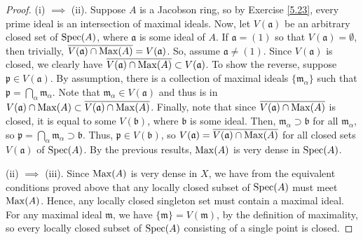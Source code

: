 \begin{proof}
(i) $\implies$ (ii). Suppose $A$ is a Jacobson ring, so by Exercise \ref{5.23}, every prime ideal is an intersection of maximal ideals. Now, let $V(\mathfrak{a})$
be an arbitrary closed set of $\operatorname{Spec}(A)$, where $\mathfrak{a}$ is some ideal of $A$. If $\mathfrak{a} = (1)$ so that $V(\mathfrak{a}) = \emptyset$, then trivially,
$\overline{V(\mathfrak{a}) \cap \operatorname{Max}(A)} = V(\mathfrak{a})$. So, assume $\mathfrak{a} \neq (1)$. Since $V(\mathfrak{a})$ is closed, we clearly have 
$\overline{V(\mathfrak{a}) \cap \operatorname{Max}(A)} \subset V(\mathfrak{a})$. To show the reverse, suppose $\mathfrak{p} \in V(\mathfrak{a})$. By assumption, there is a 
collection of maximal ideals $\{\mathfrak{m}_{\alpha}\}$ such that $\mathfrak{p} = \bigcap_{\alpha} \mathfrak{m}_{\alpha}$. Note that $\mathfrak{m}_{\alpha} \in V(\mathfrak{a})$
and thus is in $V(\mathfrak{a}) \cap \operatorname{Max}(A) \subset \overline{V(\mathfrak{a}) \cap \operatorname{Max}(A)}$. Finally, note that since $\overline{V(\mathfrak{a}) \cap \operatorname{Max}(A)}$
is closed, it is equal to some $V(\mathfrak{b})$, where $\mathfrak{b}$ is some ideal. Then, $\mathfrak{m}_{\alpha} \supset \mathfrak{b}$ for all $\mathfrak{m}_{\alpha}$,
so $\mathfrak{p} = \bigcap_{\alpha} \mathfrak{m}_{\alpha} \supset \mathfrak{b}$. Thus, $\mathfrak{p} \in V(\mathfrak{b})$, so 
$V(\mathfrak{a}) = \overline{V(\mathfrak{a}) \cap \operatorname{Max}(A)}$ for all closed sets $V(\mathfrak{a})$ of $\operatorname{Spec}(A)$. By the previous results, $\operatorname{Max}(A)$ is very dense in $\operatorname{Spec}(A)$.

(ii) $\implies$ (iii). Since $\operatorname{Max}(A)$ is very dense in $X$, we have from the equivalent conditions proved above that any locally closed subset of $\operatorname{Spec}(A)$ must meet
$\operatorname{Max}(A)$. Hence, any locally closed singleton set must contain a maximal ideal. For any maximal ideal $\mathfrak{m}$, we have $\{\mathfrak{m}\} = V(\mathfrak{m})$, by
the definition of maximality, so every locally closed subset of $\operatorname{Spec}(A)$ consisting of a single point is closed.


\end{proof}
